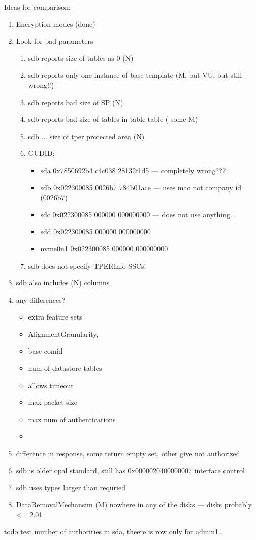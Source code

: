 Ideas for comparison:
\begin{enumerate}
    \item Encryption modes (done)
    \item Look for bad parameters \begin{enumerate}
        \item sdb reports size of tables as 0 (N)
        \item sdb reports only one instance of base template (M, but VU, but still wrong!!)
        \item sdb reports bad size of SP (N)
        \item sdb reports bad size of tables in table table ( some M)
        \item sdb ... size of tper protected area (N)
        \item GUDID: \begin{itemize}
\item sda     0x7850692b4 c4c038 28132f1d5 --- completely wrong???
\item sdb     0x022300085 0026b7 784b01ace --- uses mac not company id (0026b7)
\item sdc     0x022300085 000000 000000000 --- does not use anything...
\item sdd     0x022300085 000000 000000000
\item nvme0n1 0x022300085 000000 000000000
        \end{itemize}
        \item sdb does not specify  TPERInfo SSCs!
    \end{enumerate}
    \item sdb also includes (N) columns
    \item any differences? \begin{itemize}
        \item extra feature sets
        \item AlignmentGranularity, 
        \item base comid
        \item num of datastore tables
        \item allows timeout
        \item max packet size
        \item max num of authentications
        \item 
    \end{itemize}
    \item difference in response, some return empty set, other give not authorized
    \item sdb is older opal standard, still has 0x0000020400000007 interface control
    \item sdb uses types larger than requried

    \item DataRemovalMechansim (M) nowhere in any of the disks --- disks probably <= 2.01
\end{enumerate}

todo test number of authorities in sda, theere is row only for admin1..


